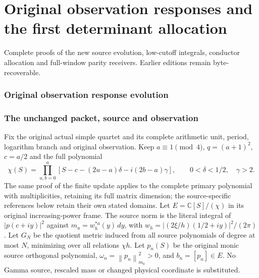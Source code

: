\begingroup
\clearpage
\part{Original observation responses and the first determinant allocation}
\noindent Complete proofs of the new source evolution, low-cutoff integrals, conductor allocation and full-window parity receivers. Earlier editions remain byte-recoverable.
\providecommand{\tightlist}{\setlength{\itemsep}{0pt}\setlength{\parskip}{0pt}}
\providecommand{\C}{\mathbb C}\providecommand{\R}{\mathbb R}
\providecommand{\Z}{\mathbb Z}\providecommand{\Q}{\mathbb Q}
\providecommand{\N}{\mathbb N}
\providecommand{\im}{\operatorname{im}}
\providecommand{\diag}{\operatorname{diag}}
\providecommand{\Gr}{\operatorname{Gram}}
\providecommand{\Gram}{\operatorname{Gram}}
\providecommand{\Res}{\operatorname{Res}}
\providecommand{\cond}{\operatorname{cond}}
\providecommand{\ExtensionTok}[1]{#1}\providecommand{\NormalTok}[1]{#1}
\providecommand{\StringTok}[1]{#1}\providecommand{\BuiltInTok}[1]{#1}
\providecommand{\ControlFlowTok}[1]{#1}

\clearpage
\begingroup
\def\C{\mathbb C}
\def\im{\operatorname{im}}
\def\Tr{\operatorname{Tr}}
\def\norm#1{\left\lVert#1\right\rVert}

\setcounter{equation}{0}
\renewcommand{\theequation}{A04ORE.\arabic{equation}}
\section*{Original observation response evolution}


\section{The unchanged packet, source and observation}
Fix the original actual simple quartet and its complete arithmetic unit,
period, logarithm branch and original observation. Keep
$a\equiv1\pmod4$, $q=(a+1)^2$, $c=a/2$ and the full polynomial
\[
 \chi(S)=\prod_{u,b=0}^a
 [S-c-(2u-a)\delta-i(2b-a)\gamma],\qquad
 0<\delta<1/2,\quad\gamma>2.                         \tag{ORE1}
\]
The same proof of the finite update applies to the complete primary
polynomial with multiplicities, retaining its full matrix dimension;
the source-specific references below retain their own stated domains.
Let $E=\C[S]/(\chi)$ in its original increasing-power frame.
The source norm is the literal integral of $|p(c+iy)|^2$ against
$m_a=w_h^{*a}(y)\,dy$, with $w_h=|(2\xi/h)(1/2+iy)|^2/(2\pi)$.
Let $G_N$ be the quotient metric induced from all source polynomials
of degree at most $N$, minimizing over all relations $\chi h$.
Let $p_n(S)$ be the original monic source orthogonal polynomial,
$\omega_n=\norm{p_n}_{m_a}^2>0$, and $b_n=[p_n]\in E$.
No Gamma source, rescaled mass or changed physical coordinate is substituted.

